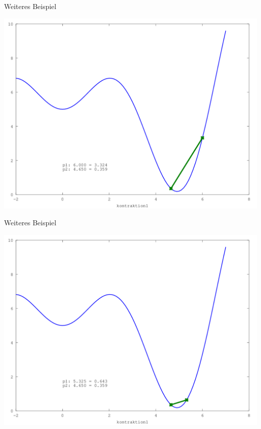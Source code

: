 \documentclass[\outputformat]{beamer}
\begin{document}
\begin{frame}{Weiteres Beispiel}
	\begin{center}
		\includegraphics[height=0.75\paperheight]{../bilder/GlobMinima/sinx_x005.png}
	\end{center}
\end{frame}
\begin{frame}{Weiteres Beispiel}
	\begin{center}
		\includegraphics[height=0.75\paperheight]{../bilder/GlobMinima/sinx_x006.png}
	\end{center}
\end{frame}
\end{document}
